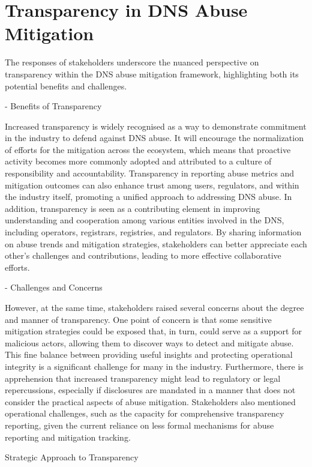 \section{Transparency in DNS Abuse Mitigation} 

The responses of stakeholders underscore the nuanced perspective on transparency within the DNS abuse mitigation framework, highlighting both its potential benefits and challenges.

- Benefits of Transparency

Increased transparency is widely recognised as a way to demonstrate commitment in the industry to defend against DNS abuse. It will encourage the normalization of efforts for the mitigation across the ecosystem, which means that proactive activity becomes more commonly adopted and attributed to a culture of responsibility and accountability. Transparency in reporting abuse metrics and mitigation outcomes can also enhance trust among users, regulators, and within the industry itself, promoting a unified approach to addressing DNS abuse. In addition, transparency is seen as a contributing element in improving understanding and cooperation among various entities involved in the DNS, including operators, registrars, registries, and regulators. By sharing information on abuse trends and mitigation strategies, stakeholders can better appreciate each other's challenges and contributions, leading to more effective collaborative efforts.


- Challenges and Concerns

However, at the same time, stakeholders raised several concerns about the degree and manner of transparency. One point of concern is that some sensitive mitigation strategies could be exposed that, in turn, could serve as a support for malicious actors, allowing them to discover ways to detect and mitigate abuse. This fine balance between providing useful insights and protecting operational integrity is a significant challenge for many in the industry. Furthermore, there is apprehension that increased transparency might lead to regulatory or legal repercussions, especially if disclosures are mandated in a manner that does not consider the practical aspects of abuse mitigation. Stakeholders also mentioned operational challenges, such as the capacity for comprehensive transparency reporting, given the current reliance on less formal mechanisms for abuse reporting and mitigation tracking.


Strategic Approach to Transparency

